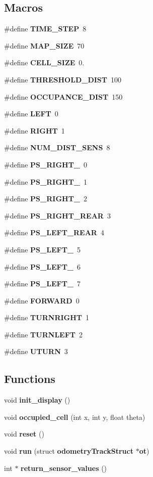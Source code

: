\subsection*{Macros}
\begin{DoxyCompactItemize}
\item 
\#define {\bf T\-I\-M\-E\-\_\-\-S\-T\-E\-P}~8
\item 
\#define {\bf M\-A\-P\-\_\-\-S\-I\-Z\-E}~70
\item 
\#define {\bf C\-E\-L\-L\-\_\-\-S\-I\-Z\-E}~0.
\item 
\#define {\bf T\-H\-R\-E\-S\-H\-O\-L\-D\-\_\-\-D\-I\-S\-T}~100
\item 
\#define {\bf O\-C\-C\-U\-P\-A\-N\-C\-E\-\_\-\-D\-I\-S\-T}~150
\item 
\#define {\bf L\-E\-F\-T}~0
\item 
\#define {\bf R\-I\-G\-H\-T}~1
\item 
\#define {\bf N\-U\-M\-\_\-\-D\-I\-S\-T\-\_\-\-S\-E\-N\-S}~8
\item 
\#define {\bf P\-S\-\_\-\-R\-I\-G\-H\-T\-\_}~0
\item 
\#define {\bf P\-S\-\_\-\-R\-I\-G\-H\-T\-\_}~1
\item 
\#define {\bf P\-S\-\_\-\-R\-I\-G\-H\-T\-\_}~2
\item 
\#define {\bf P\-S\-\_\-\-R\-I\-G\-H\-T\-\_\-\-R\-E\-A\-R}~3
\item 
\#define {\bf P\-S\-\_\-\-L\-E\-F\-T\-\_\-\-R\-E\-A\-R}~4
\item 
\#define {\bf P\-S\-\_\-\-L\-E\-F\-T\-\_}~5
\item 
\#define {\bf P\-S\-\_\-\-L\-E\-F\-T\-\_}~6
\item 
\#define {\bf P\-S\-\_\-\-L\-E\-F\-T\-\_}~7
\item 
\#define {\bf F\-O\-R\-W\-A\-R\-D}~0
\item 
\#define {\bf T\-U\-R\-N\-R\-I\-G\-H\-T}~1
\item 
\#define {\bf T\-U\-R\-N\-L\-E\-F\-T}~2
\item 
\#define {\bf U\-T\-U\-R\-N}~3
\end{DoxyCompactItemize}
\subsection*{Functions}
\begin{DoxyCompactItemize}
\item 
void {\bf init\-\_\-display} ()
\item 
void {\bf occupied\-\_\-cell} (int x, int y, float theta)
\item 
void {\bf reset} ()
\item 
void {\bf run} (struct {\bf odometry\-Track\-Struct} $\ast${\bf ot})
\item 
int $\ast$ {\bf return\-\_\-sensor\-\_\-values} ()
\end{DoxyCompactItemize}
